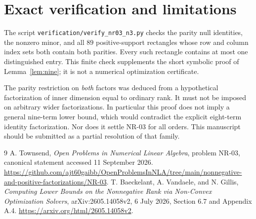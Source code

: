 \documentclass[11pt]{article}
\begin{document}
\section{Exact verification and limitations}
The script \texttt{verification/verify\_nr03\_n3.py} checks the parity null identities, the nonzero minor, and all $89$ positive-support rectangles whose row and column index sets both contain both parities. Every such rectangle contains at most one distinguished entry. This finite check supplements the short symbolic proof of Lemma~\ref{lem:nine}; it is not a numerical optimization certificate.

The parity restriction on \emph{both} factors was deduced from a hypothetical factorization of inner dimension equal to ordinary rank. It must not be imposed on arbitrary wider factorizations. In particular this proof does not imply a general nine-term lower bound, which would contradict the explicit eight-term identity factorization. Nor does it settle NR-03 for all orders. This manuscript should be submitted as a partial resolution of that family.

\begin{thebibliography}{9}
A. Townsend, \emph{Open Problems in Numerical Linear Algebra}, problem NR-03,
canonical statement accessed 11 September 2026.
\url{https://github.com/ajt60gaibb/OpenProblemsInNLA/tree/main/nonnegative-and-positive-factorizations/NR-03}.
T. Baeckelant, A. Vandaele, and N. Gillis,
\emph{Computing Lower Bounds on the Nonnegative Rank via Non-Convex Optimization Solvers},
arXiv:2605.14058v2, 6 July 2026, Section 6.7 and Appendix A.4.
\url{https://arxiv.org/html/2605.14058v2}.
\end{thebibliography}
\end{document}
